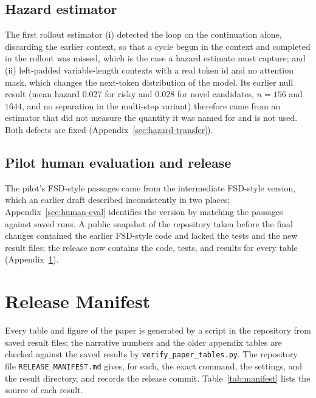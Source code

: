 \documentclass[make,article,submit,pdftex]{Definitions/mdpi}
\begin{document}
\subsection*{Hazard estimator}
The first rollout estimator (i) detected the loop on the continuation alone, discarding the earlier context, so that a cycle begun in the context and completed in the rollout was missed, which is the case a hazard estimate must capture; and (ii) left-padded variable-length contexts with a real token id and no attention mask, which changes the next-token distribution of the model. Its earlier null result (mean hazard 0.027 for risky and 0.028 for novel candidates, $n{=}156$ and $1644$, and no separation in the multi-step variant) therefore came from an estimator that did not measure the quantity it was named for and is not used. Both defects are fixed (Appendix~\ref{sec:hazard-transfer}).

\subsection*{Pilot human evaluation and release}
The pilot's FSD-style passages came from the intermediate FSD-style version, which an earlier draft described inconsistently in two places; Appendix~\ref{sec:human-eval} identifies the version by matching the passages against saved runs. A public snapshot of the repository taken before the final changes contained the earlier FSD-style code and lacked the tests and the new result files; the release now contains the code, tests, and results for every table (Appendix~\ref{sec:reproducibility}).


\section{Release Manifest}
\label{sec:reproducibility}

Every table and figure of the paper is generated by a script in the repository from saved result files; the narrative numbers and the older appendix tables are checked against the saved results by \texttt{verify\_\allowbreak{}paper\_\allowbreak{}tables.py}. The repository file \texttt{RELEASE\_\allowbreak{}MANIFEST.md} gives, for each, the exact command, the settings, and the result directory, and records the release commit. Table~\ref{tab:manifest} lists the source of each result.
\end{document}
